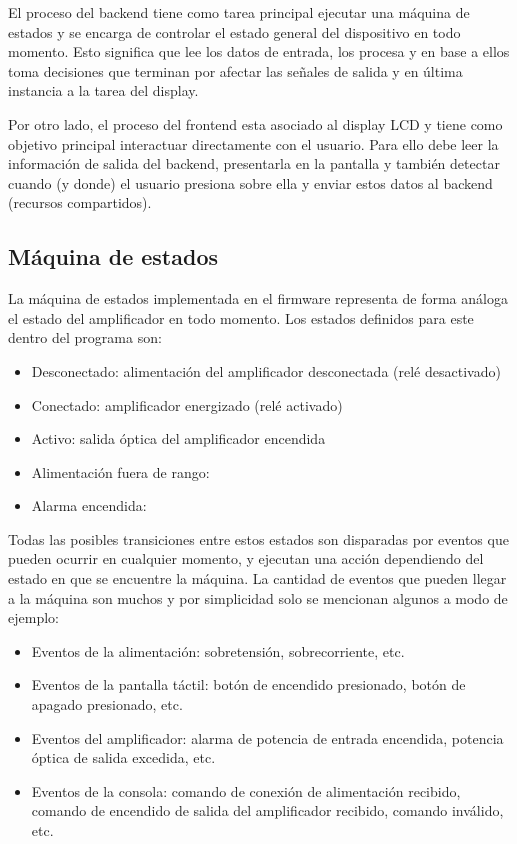 El proceso del backend tiene como tarea principal ejecutar una máquina de estados y se encarga de controlar el estado general del dispositivo en todo momento. Esto significa que lee los datos de entrada, los procesa y en base a ellos toma decisiones que terminan por afectar las señales de salida y en última instancia a la tarea del display.

Por otro lado, el proceso del frontend esta asociado al display LCD y tiene como objetivo principal interactuar directamente con el usuario. Para ello debe leer la información de salida del backend, presentarla en la pantalla y también detectar cuando (y donde) el usuario presiona sobre ella y enviar estos datos al backend (recursos compartidos). 


\subsection{Máquina de estados}

La máquina de estados implementada en el firmware representa de forma análoga el estado del amplificador en todo momento. Los estados definidos para este dentro del programa son:

\begin{itemize}
\item Desconectado: alimentación del amplificador desconectada (relé desactivado)
\item Conectado: amplificador energizado (relé activado)
\item Activo: salida óptica del amplificador encendida
\item Alimentación fuera de rango: 
\item Alarma encendida: 
\end{itemize}

Todas las posibles transiciones entre estos estados son disparadas por eventos que pueden ocurrir en cualquier momento, y ejecutan una acción dependiendo del estado en que se encuentre la máquina. La cantidad de eventos que pueden llegar a la máquina son muchos y por simplicidad solo se mencionan algunos a modo de ejemplo:

\begin{itemize}
\item Eventos de la alimentación: sobretensión, sobrecorriente, etc.
\item Eventos de la pantalla táctil: botón de encendido presionado, botón de apagado presionado, etc.
\item Eventos del amplificador: alarma de potencia de entrada encendida, potencia óptica de salida excedida, etc.
\item Eventos de la consola: comando de conexión de alimentación recibido, comando de encendido de salida del amplificador recibido, comando inválido, etc.
\end{itemize}


